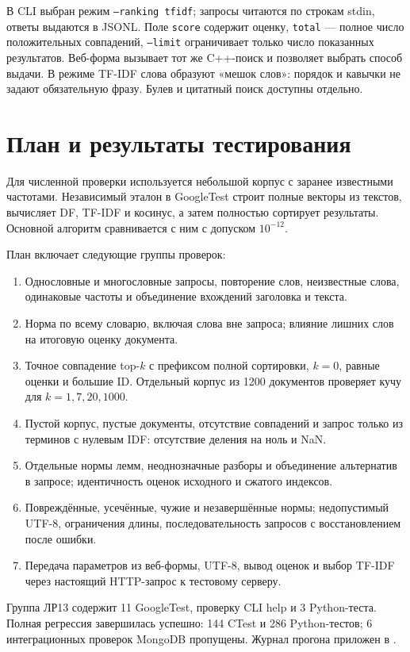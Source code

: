\documentclass[12pt,a4paper]{article}
\begin{document}
В CLI выбран режим \texttt{--ranking tfidf}; запросы читаются по строкам
stdin, ответы выдаются в JSONL. Поле \texttt{score} содержит оценку,
\texttt{total} --- полное число положительных совпадений,
\texttt{--limit} ограничивает только число показанных результатов.
Веб-форма вызывает тот же C++-поиск и позволяет выбрать способ выдачи.
В режиме TF-IDF слова образуют «мешок слов»: порядок и кавычки
не задают обязательную фразу. Булев и цитатный поиск доступны отдельно.

\section{План и результаты тестирования}
Для численной проверки используется небольшой корпус с заранее известными
частотами. Независимый эталон в GoogleTest строит полные векторы из текстов,
вычисляет DF, TF-IDF и косинус, а затем полностью сортирует результаты.
Основной алгоритм сравнивается с ним с допуском $10^{-12}$.

План включает следующие группы проверок:
\begin{enumerate}
\item Однословные и многословные запросы, повторение слов, неизвестные слова,
      одинаковые частоты и объединение вхождений заголовка и текста.
\item Норма по всему словарю, включая слова вне запроса; влияние лишних слов
      на итоговую оценку документа.
\item Точное совпадение top-$k$ с префиксом полной сортировки,
      $k=0$, равные оценки и большие ID. Отдельный корпус из 1200 документов
      проверяет кучу для $k=1,7,20,1000$.
\item Пустой корпус, пустые документы, отсутствие совпадений и запрос только
      из терминов с нулевым IDF: отсутствие деления на ноль и NaN.
\item Отдельные нормы лемм, неоднозначные разборы и объединение альтернатив
      в запросе; идентичность оценок исходного и сжатого индексов.
\item Повреждённые, усечённые, чужие и незавершённые нормы; недопустимый UTF-8,
      ограничения длины, последовательность запросов с восстановлением после ошибки.
\item Передача параметров из веб-формы, UTF-8, вывод оценок и выбор TF-IDF
      через настоящий HTTP-запрос к тестовому серверу.
\end{enumerate}

Группа ЛР13 содержит 11 GoogleTest, проверку CLI help и 3 Python-теста.
Полная регрессия завершилась успешно: 144 CTest и 286 Python-тестов;
6 интеграционных проверок MongoDB пропущены.
Журнал прогона приложен в .
\end{document}
